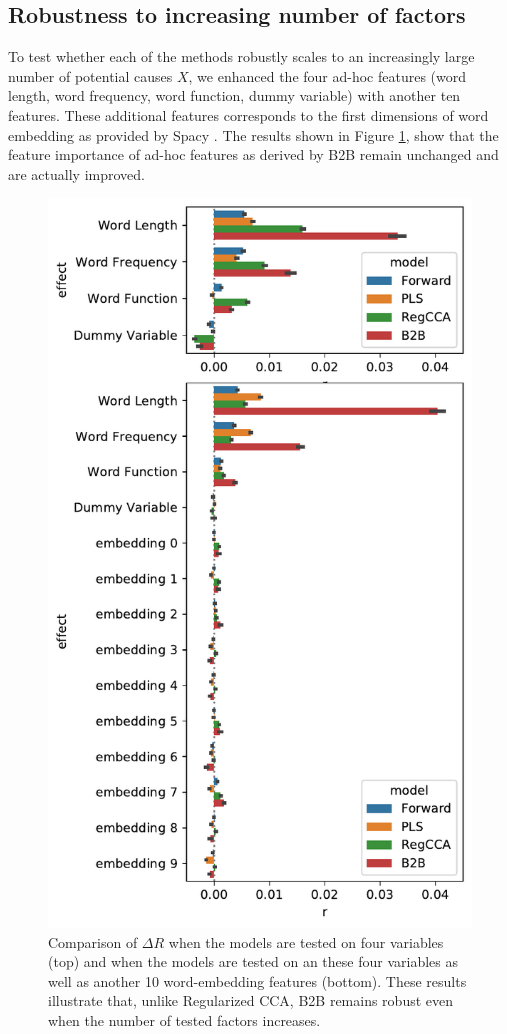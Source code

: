 \subsection{Robustness to increasing number of factors}

To test whether each of the methods robustly scales to an increasingly
large number of potential causes $X$, we enhanced the four ad-hoc features
(word length, word frequency, word function, dummy variable) with another
ten features. These additional features corresponds to the first dimensions
of word embedding as provided by Spacy \citep{spacy2}. The results shown
in Figure \ref{fig:embeddings}, show that the feature importance of ad-hoc
features as derived by B2B remain unchanged and are actually improved.

\begin{figure}
  \centering
  \includegraphics[width=0.5\linewidth]{figures/compare_embeddings.pdf}
  \caption{Comparison of $\Delta R$ when the models are tested on four
  variables (top) and when the models are tested on an these four variables
  as well as another 10 word-embedding features (bottom). These results
  illustrate that, unlike Regularized CCA, B2B remains robust even when
  the number of tested factors increases.
  \label{fig:embeddings}}
\end{figure}
